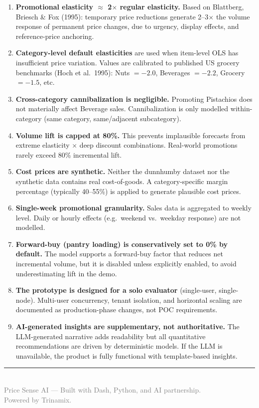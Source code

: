 \documentclass[11pt, a4paper]{article}
\begin{document}
\begin{enumerate}[leftmargin=1.5em]
    \item \textbf{Promotional elasticity $\approx$ 2$\times$ regular elasticity.} Based on Blattberg, Briesch \& Fox (1995): temporary price reductions generate 2--3$\times$ the volume response of permanent price changes, due to urgency, display effects, and reference-price anchoring.

    \item \textbf{Category-level default elasticities} are used when item-level OLS has insufficient price variation. Values are calibrated to published US grocery benchmarks (Hoch et al.\ 1995): Nuts $= -2.0$, Beverages $= -2.2$, Grocery $= -1.5$, etc.

    \item \textbf{Cross-category cannibalization is negligible.} Promoting Pistachios does not materially affect Beverage sales. Cannibalization is only modelled within-category (same category, same/adjacent subcategory).

    \item \textbf{Volume lift is capped at 80\%.} This prevents implausible forecasts from extreme elasticity $\times$ deep discount combinations. Real-world promotions rarely exceed 80\% incremental lift.

    \item \textbf{Cost prices are synthetic.} Neither the dunnhumby dataset nor the synthetic data contains real cost-of-goods. A category-specific margin percentage (typically 40--55\%) is applied to generate plausible cost prices.

    \item \textbf{Single-week promotional granularity.} Sales data is aggregated to weekly level. Daily or hourly effects (e.g.\ weekend vs.\ weekday response) are not modelled.

    \item \textbf{Forward-buy (pantry loading) is conservatively set to 0\% by default.} The model supports a forward-buy factor that reduces net incremental volume, but it is disabled unless explicitly enabled, to avoid underestimating lift in the demo.

    \item \textbf{The prototype is designed for a solo evaluator} (single-user, single-node). Multi-user concurrency, tenant isolation, and horizontal scaling are documented as production-phase changes, not POC requirements.

    \item \textbf{AI-generated insights are supplementary, not authoritative.} The LLM-generated narrative adds readability but all quantitative recommendations are driven by deterministic models. If the LLM is unavailable, the product is fully functional with template-based insights.
\end{enumerate}


\vspace{2em}
\begin{center}
    \rule{0.5\textwidth}{0.4pt}\\[6pt]
    {\small\textcolor{gray}{Price Sense AI --- Built with Dash, Python, and AI partnership.}}\\
    {\small\textcolor{gray}{Powered by Trinamix.}}
\end{center}
\end{document}
